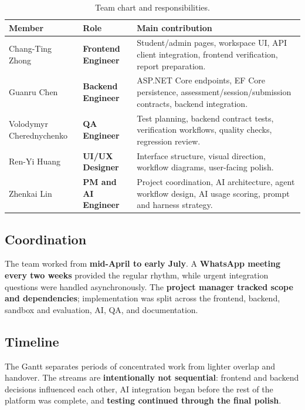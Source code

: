 \documentclass[11pt,a4paper]{article}
\begin{document}
\begin{table}[H]
\centering
\begin{tabularx}{\linewidth}{l l X}
\toprule
Member & Role & Main contribution \\
\midrule
Chang-Ting Zhong & \textbf{Frontend Engineer} & Student/admin pages, workspace UI, API client integration, frontend verification, report preparation. \\
Guanru Chen & \textbf{Backend Engineer} & ASP.NET Core endpoints, EF Core persistence, assessment/session/submission contracts, backend integration. \\
Volodymyr Cherednychenko & \textbf{QA Engineer} & Test planning, backend contract tests, verification workflows, quality checks, regression review. \\
Ren-Yi Huang & \textbf{UI/UX Designer} & Interface structure, visual direction, workflow diagrams, user-facing polish. \\
Zhenkai Lin & \textbf{PM and AI Engineer} & Project coordination, AI architecture, agent workflow design, AI usage scoring, prompt and harness strategy. \\
\bottomrule
\end{tabularx}
\caption{Team chart and responsibilities.}
\end{table}

\subsection{Coordination}

The team worked from \textbf{mid-April to early July}. A \textbf{WhatsApp meeting every two weeks} provided the regular rhythm, while urgent integration questions were handled asynchronously. The \textbf{project manager tracked scope and dependencies}; implementation was split across the frontend, backend, sandbox and evaluation, AI, QA, and documentation.

\subsection{Timeline}

The Gantt separates periods of concentrated work from lighter overlap and handover. The streams are \textbf{intentionally not sequential}: frontend and backend decisions influenced each other, AI integration began before the rest of the platform was complete, and \textbf{testing continued through the final polish}.
\end{document}
